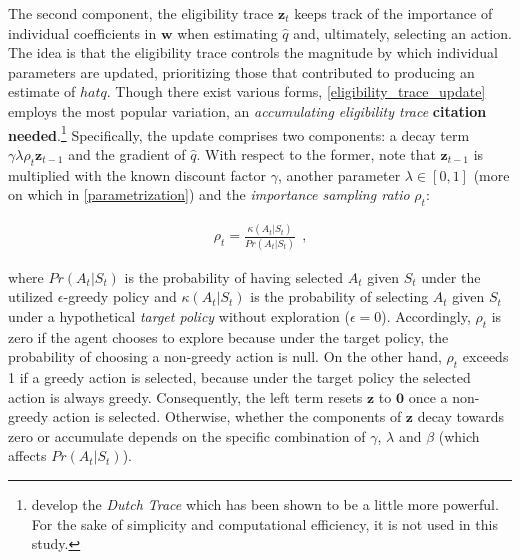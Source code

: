 The second component, the eligibility trace $\boldsymbol{z}_t$ keeps track of the importance of individual coefficients in $\boldsymbol{w}$ when estimating $\hat{q}$ and, ultimately, selecting an action. The idea is that the eligibility trace controls the magnitude by which individual parameters are updated, prioritizing those that contributed to producing an estimate of $hat{q}$. Though there exist various forms, \autoref{eligibility_trace_update} employs the most popular variation, an \emph{accumulating eligibility trace} \textbf{citation needed}.\footnote{\textcite{seijen_true_2014} develop the \emph{Dutch Trace} which has been shown to be a little more powerful. For the sake of simplicity and computational efficiency, it is not used in this study.} Specifically, the update comprises two components: a decay term $\gamma \lambda \rho_t \boldsymbol{z}_{t-1}$ and the gradient of $\hat{q}$. With respect to the former, note that $\boldsymbol{z}_{t-1}$ is multiplied with the known discount factor $\gamma$, another parameter $\lambda \in [0,1]$ (more on which in \autoref{parametrization}) and the \emph{importance sampling ratio} $\rho_t$:

\begin{gather}
	 \rho_t = \frac{\kappa(A_t|S_{t})}{Pr(A_t|S_t)} ~~  \text{,}
\end{gather}

where $Pr(A_t|S_t)$ is the probability of having selected $A_t$ given $S_t$ under the utilized $\epsilon$-greedy policy and $\kappa(A_t|S_t)$ is the probability of selecting $A_t$ given $S_t$ under a hypothetical \emph{target policy} without exploration ($\epsilon = 0$). Accordingly, $\rho_t$ is zero if the agent chooses to explore because under the target policy, the probability of choosing a non-greedy action is null. On the other hand, $\rho_t$ exceeds 1 if a greedy action is selected, because under the target policy the selected action is always greedy. Consequently, the left term resets $\boldsymbol{z}$ to $\boldsymbol{0}$ once a non-greedy action is selected. Otherwise, whether the components of $\boldsymbol{z}$ decay towards zero or accumulate depends on the specific combination of $\gamma$, $\lambda$ and $\beta$ (which affects $Pr(A_t|S_t)$).

